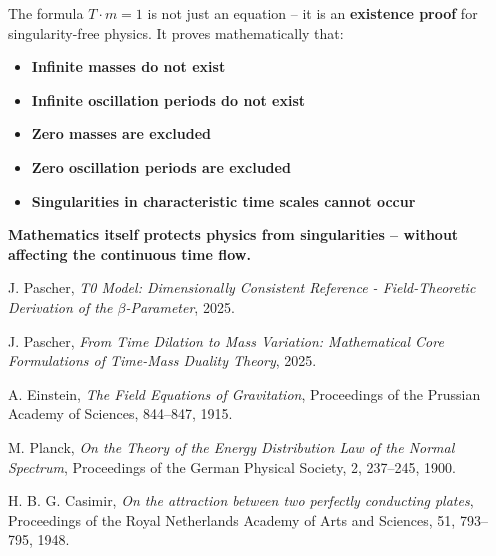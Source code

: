 \documentclass[12pt,a4paper]{article}
\theoremstyle{definition}
\theoremstyle{remark}
\begin{document}
	The formula $T \cdot m = 1$ is not just an equation -- it is an \textbf{existence proof} for singularity-free physics. It proves mathematically that:
	
	\begin{itemize}
		\item \textbf{Infinite masses do not exist}
		\item \textbf{Infinite oscillation periods do not exist}
		\item \textbf{Zero masses are excluded}
		\item \textbf{Zero oscillation periods are excluded}
		\item \textbf{Singularities in characteristic time scales cannot occur}
	\end{itemize}
	
	\textbf{Mathematics itself protects physics from singularities -- without affecting the continuous time flow.}    
	\begin{thebibliography}{99}

		
		J. Pascher, \textit{T0 Model: Dimensionally Consistent Reference - Field-Theoretic Derivation of the $\beta$-Parameter}, 2025.
		
		J. Pascher, \textit{From Time Dilation to Mass Variation: Mathematical Core Formulations of Time-Mass Duality Theory}, 2025.
		
		A. Einstein, \textit{The Field Equations of Gravitation}, Proceedings of the Prussian Academy of Sciences, 844--847, 1915.
		
		M. Planck, \textit{On the Theory of the Energy Distribution Law of the Normal Spectrum}, Proceedings of the German Physical Society, 2, 237--245, 1900.
		
		H. B. G. Casimir, \textit{On the attraction between two perfectly conducting plates}, Proceedings of the Royal Netherlands Academy of Arts and Sciences, 51, 793--795, 1948.
	\end{thebibliography}
	
\end{document}
